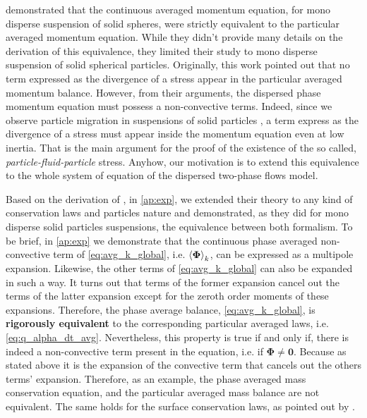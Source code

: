 \citet{nott2011suspension} demonstrated that the continuous averaged momentum equation, for mono disperse suspension of solid spheres, were strictly equivalent to the particular averaged momentum equation.
While they didn't provide many details on the derivation of this equivalence, they limited their study to mono disperse suspension of solid spherical particles.
Originally, this work pointed out that no term expressed as the divergence of a stress appear in the particular averaged momentum balance.
However, from their arguments, the dispersed phase momentum equation must possess a non-convective terms.
Indeed, since we observe particle migration in suspensions of solid particles \citep{guazzelli2011}, a term express as the divergence of a stress must appear inside the momentum equation even at low inertia.
That is the main argument for the proof of the existence of the so called, \textit{particle-fluid-particle} stress.
Anyhow, our motivation is to extend this equivalence to the whole system of equation of the dispersed two-phase flows model.

Based on the derivation of \citet{nott2011suspension}, in \ref{ap:exp}, we extended their theory to any kind of conservation laws and particles nature and demonstrated, as they did for mono disperse solid particles suspensions, the equivalence between both formalism.
To be brief, in \ref{ap:exp} we demonstrate that the continuous phase averaged non-convective term of \ref{eq:avg_k_global}, i.e.  $\left<\mathbf{\Phi}\right>_k$, can  be expressed as a multipole expansion.
Likewise, the other terms of \ref{eq:avg_k_global} can also be expanded in such a way.
It turns out that terms of the former expansion cancel out the terms of the latter expansion except for the zeroth order moments of these expansions.
Therefore, the phase average balance, \ref{eq:avg_k_global}, is \textbf{rigorously equivalent} to the corresponding particular averaged laws, i.e. \ref{eq:q_alpha_dt_avg}.
Nevertheless, this property is true if and only if, there is indeed a non-convective term present in the equation, i.e. if $\mathbf{\Phi} \neq \textbf{0}$. Because as stated above it is the expansion of the convective term that cancels out the others terms' expansion.
Therefore, as an example, the phase averaged mass conservation equation, and the particular averaged mass balance are not equivalent.
The same holds for the surface conservation laws, as pointed out by \citet{lhuillier2000bilan}.


